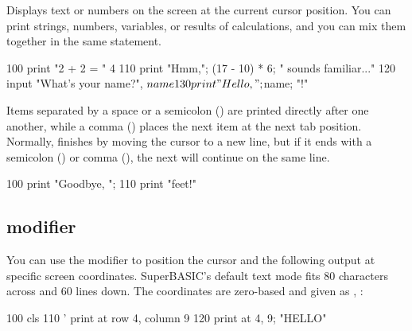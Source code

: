 \begin{entry}
Displays text or numbers on the screen at the current cursor position. You can print strings, numbers, variables, or results of calculations, and you can mix them together in the same statement.

\begin{lstexample}
100 print "2 + 2 = " 4
110 print "Hmm,"; (17 - 10) * 6; " sounds familiar..."
120 input "What's your name?", $name
130 print "Hello, "; $name; "!"
\end{lstexample}

Items separated by a space or a semicolon (\code{;}) are printed directly after one another, while a comma (\code{,}) places the next item at the next tab position.\\

Normally,  finishes by moving the cursor to a new line, but if it ends with a semicolon \mbox{(\code{;})} or comma (\code{,}), the next  will continue on the same line.

\begin{lstexample}
100 print "Goodbye, ";
110 print "feet!"
\end{lstexample}

\subsection*{ modifier}

You can use the  modifier to position the cursor and the following  output at specific screen coordinates.  SuperBASIC’s default text mode fits 80 characters across and 60 lines down. The  coordinates are zero-based and given as , :

\begin{lstexample}
100 cls
110 ' print at row 4, column 9
120 print at 4, 9; "HELLO"
\end{lstexample}

{ %
    \newcommand{\cellw}{0.38cm}
    \newcommand{\cellh}{0.38cm}

    \newcommand{\cutX}{25}   %
    \newcommand{\cutY}{15}   %

    \newcommand{\amp}{0.09}   %
    \newcommand{\lam}{1}    %
    \newcommand{\step}{0.25}  %
    \newcommand{\samps}{400}  %

}
\end{entry}
